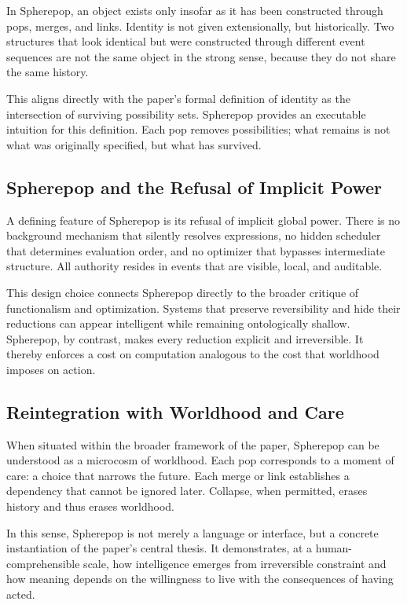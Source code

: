 \documentclass[11pt]{article}
\begin{document}
In Spherepop, an object exists only insofar as it has been constructed through pops, merges, and links. Identity is not given extensionally, but historically. Two structures that look identical but were constructed through different event sequences are not the same object in the strong sense, because they do not share the same history.

This aligns directly with the paper’s formal definition of identity as the intersection of surviving possibility sets. Spherepop provides an executable intuition for this definition. Each pop removes possibilities; what remains is not what was originally specified, but what has survived.

\subsection{Spherepop and the Refusal of Implicit Power}

A defining feature of Spherepop is its refusal of implicit global power. There is no background mechanism that silently resolves expressions, no hidden scheduler that determines evaluation order, and no optimizer that bypasses intermediate structure. All authority resides in events that are visible, local, and auditable.

This design choice connects Spherepop directly to the broader critique of functionalism and optimization. Systems that preserve reversibility and hide their reductions can appear intelligent while remaining ontologically shallow. Spherepop, by contrast, makes every reduction explicit and irreversible. It thereby enforces a cost on computation analogous to the cost that worldhood imposes on action.

\subsection{Reintegration with Worldhood and Care}

When situated within the broader framework of the paper, Spherepop can be understood as a microcosm of worldhood. Each pop corresponds to a moment of care: a choice that narrows the future. Each merge or link establishes a dependency that cannot be ignored later. Collapse, when permitted, erases history and thus erases worldhood.

In this sense, Spherepop is not merely a language or interface, but a concrete instantiation of the paper’s central thesis. It demonstrates, at a human-comprehensible scale, how intelligence emerges from irreversible constraint and how meaning depends on the willingness to live with the consequences of having acted.
\end{document}
